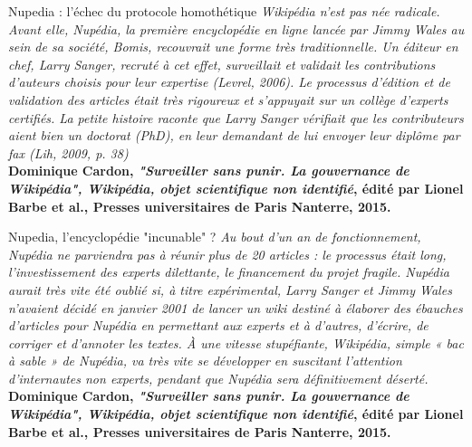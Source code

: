 \begin{frame}{Nupedia : l'échec du protocole homothétique}
    \centering
    {\small
    \textit{Wikipédia n’est pas née radicale. Avant elle, Nupédia, la première encyclopédie en ligne lancée par Jimmy Wales au sein de sa société, Bomis, recouvrait une forme très traditionnelle. Un éditeur en chef, Larry Sanger, recruté à cet effet, surveillait et validait les contributions d’auteurs choisis pour leur expertise (Levrel, 2006). Le processus d’édition et de validation des articles était très rigoureux et s’appuyait sur un collège d’experts certifiés. La petite histoire raconte que Larry Sanger vérifiait que les contributeurs aient bien un doctorat (PhD), en leur demandant de lui envoyer leur diplôme par fax (Lih, 2009, p. 38)}}\\
    \vspace{1em}
    \textbf{Dominique Cardon, \textit{"Surveiller sans punir. La gouvernance de Wikipédia", Wikipédia, objet scientifique non identifié}, édité par Lionel Barbe et al., Presses universitaires de Paris Nanterre, 2015.}
\end{frame}

\begin{frame}{Nupedia, l'encyclopédie "incunable" ?}
    \centering
    {\small
    \textit{Au bout d’un an de fonctionnement, Nupédia ne parviendra pas à réunir plus de 20 articles : le processus était long, l’investissement des experts dilettante, le financement du projet fragile. Nupédia aurait très vite été oublié si, à titre expérimental, Larry Sanger et Jimmy Wales n’avaient décidé en janvier 2001 de lancer un wiki destiné à élaborer des ébauches d’articles pour Nupédia en permettant aux experts et à d’autres, d’écrire, de corriger et d’annoter les textes. À une vitesse stupéfiante, Wikipédia, simple « bac à sable » de Nupédia, va très vite se développer en suscitant l’attention d’internautes non experts, pendant que Nupédia sera définitivement déserté.}}\\
    \vspace{1em}
    \textbf{Dominique Cardon, \textit{"Surveiller sans punir. La gouvernance de Wikipédia", Wikipédia, objet scientifique non identifié}, édité par Lionel Barbe et al., Presses universitaires de Paris Nanterre, 2015.}

\end{frame}

